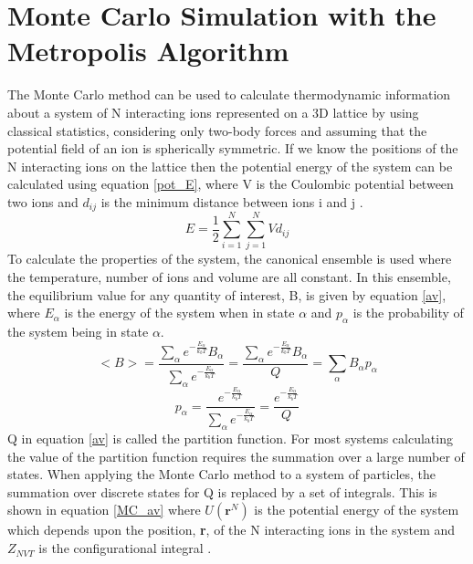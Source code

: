 \section{Monte Carlo Simulation with the Metropolis Algorithm}

The Monte Carlo method can be used to calculate thermodynamic information about a system of N interacting ions represented on a 3D lattice by using classical statistics, considering only two-body forces and assuming that the potential field of an ion is spherically symmetric. If we know the positions of the N interacting ions on the lattice then the potential energy of the system can be calculated using equation \ref{pot_E}, where V is the Coulombic potential between two ions and $d_{ij}$ is the minimum distance between ions i and j \cite{Metropolis}.
\begin{equation}\label{pot_E}
E = \frac{1}{2} \sum_{i=1}^N \sum_{j=1}^N V d_{ij}
\end{equation}
To calculate the properties of the system, the canonical ensemble is used where the temperature, number of ions and volume are all constant. In this ensemble, the equilibrium value for any quantity of interest, B, is given by equation \ref{av}, where $E_\alpha$ is the energy of the system when in state $\alpha$ and $p_\alpha$ is the probability of the system being in state $\alpha$.
\begin{equation}\label{av}
<B> = \frac{ \sum_\alpha e^{-\frac{E_\alpha}{k_bT}} B_\alpha}{ \sum_\alpha e^{-\frac{E_\alpha}{k_bT}}} = \frac{ \sum_\alpha e^{-\frac{E_\alpha}{k_bT}} B_\alpha}{Q} = \sum_\alpha B_\alpha p_\alpha
\end{equation}
\begin{equation}\label{prob}
p_\alpha = \frac{  e^{-\frac{E_\alpha}{k_bT}} }{ \sum_{\alpha} e^{-\frac{E_\alpha}{k_bT}}} =\frac{  e^{-\frac{E_\alpha}{k_bT}} }{Q}
\end{equation}
Q in equation \ref{av} is called the partition function. For most systems calculating the value of the partition function requires the summation over a large number of states. When applying the Monte Carlo method to a system of particles, the summation over discrete states for Q is replaced by a set of integrals. This is shown in equation \ref{MC_av} where $U(\mathbf{r}^N)$ is the potential energy of the system which depends upon the position, \textbf{r}, of the N interacting ions in the system and $Z_{NVT}$ is the configurational integral \cite{Lesar3}.
